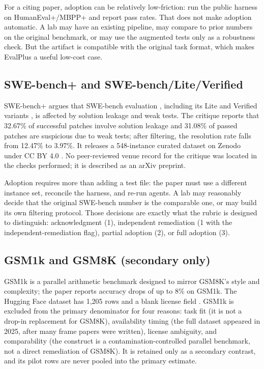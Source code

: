 \documentclass[11pt,a4paper]{article}
\begin{document}
For a citing paper, adoption can be relatively low-friction: run the public harness on HumanEval+/MBPP+ and report pass rates. That does not make adoption automatic. A lab may have an existing pipeline, may compare to prior numbers on the original benchmark, or may use the augmented tests only as a robustness check. But the artifact is compatible with the original task format, which makes EvalPlus a useful low-cost case.

\subsection{SWE-bench+ and SWE-bench/Lite/Verified}

SWE-bench+ \citep{aleithan2024} argues that SWE-bench evaluation \citep{jimenez2023}, including its Lite and Verified variants \citep{openai2024}, is affected by solution leakage and weak tests. The critique reports that 32.67\% of successful patches involve solution leakage and 31.08\% of passed patches are suspicious due to weak tests; after filtering, the resolution rate falls from 12.47\% to 3.97\%. It releases a 548-instance curated dataset on Zenodo under CC BY 4.0 \citep{swebenchplus2024}. No peer-reviewed venue record for the critique was located in the checks performed; it is described as an arXiv preprint.

Adoption requires more than adding a test file: the paper must use a different instance set, reconcile the harness, and re-run agents. A lab may reasonably decide that the original SWE-bench number is the comparable one, or may build its own filtering protocol. Those decisions are exactly what the rubric is designed to distinguish: acknowledgment (1), independent remediation (1 with the independent-remediation flag), partial adoption (2), or full adoption (3).

\subsection{GSM1k and GSM8K (secondary only)}

GSM1k \citep{zhang2024} is a parallel arithmetic benchmark designed to mirror GSM8K's style and complexity; the paper reports accuracy drops of up to 8\% on GSM1k. The Hugging Face dataset has 1,205 rows and a blank license field \citep{gsm1k2024}. GSM1k is excluded from the primary denominator for four reasons: task fit (it is not a drop-in replacement for GSM8K), availability timing (the full dataset appeared in 2025, after many frame papers were written), license ambiguity, and comparability (the construct is a contamination-controlled parallel benchmark, not a direct remediation of GSM8K). It is retained only as a secondary contrast, and its pilot rows are never pooled into the primary estimate.
\end{document}
